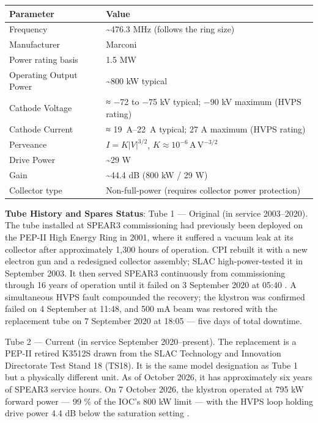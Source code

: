 \begin{longtable}[]{@{}ll@{}}
\toprule\noalign{}
Parameter & Value \\
\midrule\noalign{}
\endhead
\bottomrule\noalign{}
\endlastfoot
Frequency & \textasciitilde476.3 MHz (follows the ring size) \\
Manufacturer & Marconi \\
Power rating basis & 1.5 MW \\
Operating Output Power & \textasciitilde800 kW typical \\
Cathode Voltage & ≈ −72 to −75 kV typical; −90 kV maximum (HVPS rating) \\
Cathode Current & ≈ \qtyrange{19}{22}{\ampere} typical; 27 A maximum (HVPS rating) \\
Perveance & $I=K\lvert V\rvert^{3/2}$, $K\approx10^{-6}\,\mathrm{A\,V^{-3/2}}$ \R{56} \\
Drive Power & \textasciitilde29 W \\
Gain & \textasciitilde44.4 dB (800 kW / 29 W) \\
Collector type & Non-full-power (requires collector power protection) \\
\end{longtable}

\textbf{Tube History and Spares Status}: Tube 1 — Original (in service 2003–2020). The tube installed at SPEAR3 commissioning had previously been deployed on the PEP-II High Energy Ring in 2001, where it suffered a vacuum leak at its collector after approximately 1,300 hours of operation. CPI rebuilt it with a new electron gun and a redesigned collector assembly; SLAC high-power-tested it in September 2003. It then served SPEAR3 continuously from commissioning through 16 years of operation until it failed on 3 September 2020 at 05:40 . A simultaneous HVPS fault compounded the recovery; the klystron was confirmed failed on 4 September at 11:48, and 500 mA beam was restored with the replacement tube on 7 September 2020 at 18:05 — five days of total downtime.

Tube 2 — Current (in service September 2020–present). The replacement is a PEP-II retired K3512S drawn from the SLAC Technology and Innovation Directorate Test Stand 18 (TS18). It is the same model designation as Tube 1 but a physically different unit. As of October 2026, it has approximately six years of SPEAR3 service hours. On 7 October 2026, the klystron operated at 795 kW forward power — 99 \% of the IOC's 800 kW limit — with the HVPS loop holding drive power 4.4 dB below the saturation setting .

